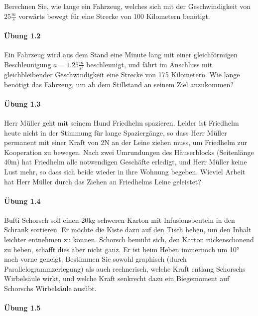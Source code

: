 
Berechnen Sie, wie lange ein Fahrzeug, welches sich mit der Geschwindigkeit von $25 \frac{m}{s}$ vorwärts bewegt für eine Strecke von 100 Kilometern benötigt.

\paragraph{Übung 1.2}

Ein Fahrzeug wird aus dem Stand eine Minute lang mit einer gleichförmigen Beschleunigung $a=1.25\frac{m}{s^2}$ beschleunigt, und fährt im Anschluss mit gleichbleibender Geschwindigkeit eine Strecke von 175 Kilometern. Wie lange benötigt das Fahrzeug, um ab dem Stillstand an seinem Ziel anzukommen?

\paragraph{Übung 1.3}

Herr Müller geht mit seinem Hund Friedhelm spazieren. Leider ist Friedhelm heute nicht in der Stimmung für lange Spaziergänge, so dass Herr Müller permanent mit einer Kraft von 2N an der Leine ziehen muss, um Friedhelm zur Kooperation zu bewegen. Nach zwei Umrundungen des Häuserblocks (Seitenlänge 40m) hat Friedhelm alle notwendigen Geschäfte erledigt, und Herr Müller keine Lust mehr, so dass sich beide wieder in ihre Wohnung begeben. Wieviel Arbeit hat Herr Müller durch das Ziehen an Friedhelms Leine geleistet?

\paragraph{Übung 1.4}

Bufti Schorsch soll einen 20kg schweren Karton mit Infusionsbeuteln in den Schrank sortieren. Er möchte die Kiste dazu auf den Tisch heben, um den Inhalt leichter entnehmen zu können. Schorsch bemüht sich, den Karton rückenschonend zu heben, schafft dies aber nicht ganz. Er ist beim Heben immernoch um 10° nach vorne geneigt. Bestimmen Sie sowohl graphisch (durch Parallelogrammzerlegung) als auch rechnerisch, welche Kraft entlang Schorschs Wirbelsäule wirkt, und welche Kraft senkrecht dazu ein Biegemoment auf Schorschs Wirbelsäule ausübt.

\paragraph{Übung 1.5}

